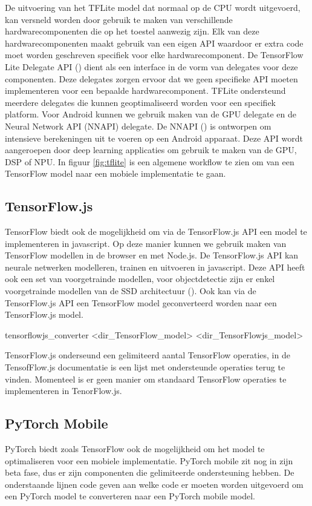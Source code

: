 De uitvoering van het TFLite model dat normaal op de CPU wordt uitgevoerd, kan versneld worden door gebruik te maken van verschillende hardwarecomponenten die op het toestel aanwezig zijn.
Elk van deze hardwarecomponenten maakt gebruik van een eigen API waardoor er extra code moet worden geschreven specifiek voor elke hardwarecomponent.
De TensorFlow Lite Delegate API (\cite{tensorflow2015-whitepaper}) dient als een interface in de vorm van delegates voor deze componenten.
Deze delegates zorgen ervoor dat we geen specifieke API moeten implementeren voor een bepaalde hardwarecomponent. 
TFLite ondersteund meerdere delegates die kunnen geoptimaliseerd worden voor een specifiek platform.
Voor Android kunnen we gebruik maken van de GPU delegate en de Neural Network API (NNAPI) delegate.
De NNAPI (\cite{Android_NNAPI_2021}) is ontworpen om intensieve berekeningen uit te voeren op een Android apparaat.
Deze API wordt aangeroepen door deep learning applicaties om gebruik te maken van de GPU, DSP of NPU.
In figuur \ref{fig:tflite} is een algemene workflow te zien om van een TensorFlow model naar een mobiele implementatie te gaan.

\subsection{TensorFlow.js}
TensorFlow biedt ook de mogelijkheid om via de TensorFlow.js API een model te implementeren in javascript.
Op deze manier kunnen we gebruik maken van TensorFlow modellen in de browser en met Node.js.
De TensorFlow.js API kan neurale netwerken modelleren, trainen en uitvoeren in javascript.
Deze API heeft ook een set van voorgetrainde modellen, voor objectdetectie zijn er enkel voorgetrainde modellen van de SSD architectuur (\cite{liu_ssd_2016}).
Ook kan via de TensorFlow.js API een TensorFlow model geconverteerd worden naar een TensorFlow.js model.

\begin{python}
tensorflowjs_converter <dir_TensorFlow_model> <dir_TensorFlowjs_model>
\end{python}

TensorFlow.js onderseund een gelimiteerd aantal TensorFlow operaties, in de TensofFlow.js documentatie is een lijst met ondersteunde operaties terug te vinden.
Momenteel is er geen manier om standaard TensorFlow operaties te implementeren in TenorFlow.js.

\subsection{PyTorch Mobile} \label{trace}
PyTorch biedt zoals TensorFlow ook de mogelijkheid om het model te optimaliseren voor een mobiele implementatie.
PyTorch mobile zit nog in zijn beta fase, dus er zijn componenten die gelimiteerde ondersteuning hebben.
De onderstaande lijnen code geven aan welke code er moeten worden uitgevoerd om een PyTorch model te converteren naar een PyTorch mobile model.

